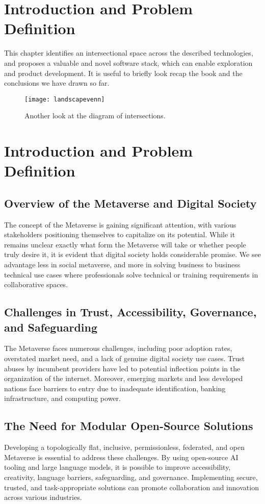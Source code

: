 \section{Introduction and Problem Definition}

This chapter identifies an intersectional space across the described technologies, and proposes a valuable and novel software stack, which can enable exploration  and product development. It is useful to briefly look recap the book and the conclusions we have drawn so far.

\begin{figure*}[ht]\centering %
	\texttt{[image: landscapevenn]}
	\caption{Another look at the diagram of intersections.}
	\label{fig:landscapevenn}
\end{figure*}


\section{Introduction and Problem Definition}
\subsection{Overview of the Metaverse and Digital Society}
The concept of the Metaverse is gaining significant attention, with various stakeholders positioning themselves to capitalize on its potential. While it remains unclear exactly what form the Metaverse will take or whether people truly desire it, it is evident that digital society holds considerable promise. We see advantage less in social metaverse, and more in solving business to business technical use cases where professionals solve technical or training requirements in collaborative spaces.

\subsection{Challenges in Trust, Accessibility, Governance, and Safeguarding}
The Metaverse faces numerous challenges, including poor adoption rates, overstated market need, and a lack of genuine digital society use cases. Trust abuses by incumbent providers have led to potential inflection points in the organization of the internet. Moreover, emerging markets and less developed nations face barriers to entry due to inadequate identification, banking infrastructure, and computing power.

\subsection{The Need for Modular Open-Source Solutions}
Developing a topologically flat, inclusive, permissionless, federated, and open Metaverse is essential to address these challenges. By using open-source AI tooling and large language models, it is possible to improve accessibility, creativity, language barriers, safeguarding, and governance. Implementing secure, trusted, and task-appropriate solutions can promote collaboration and innovation across various industries.

